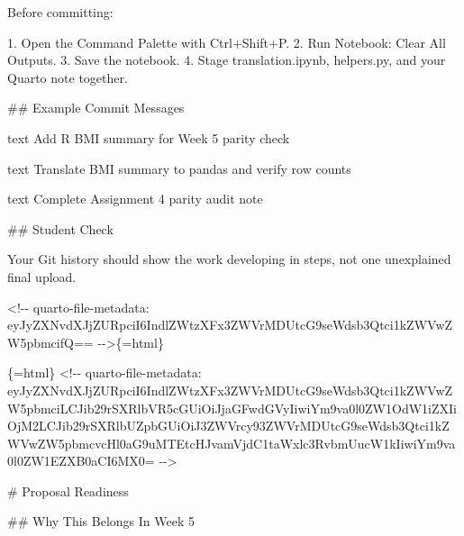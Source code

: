 \documentclass[
  letterpaper,
  DIV=11,
  numbers=noendperiod,
  oneside]{scrreprt}
\newenvironment{Shaded}{\begin{snugshade}}{\end{snugshade}}
\newcommand{\FunctionTok}[1]{\textcolor[rgb]{0.28,0.35,0.67}{#1}}
\newcommand{\InformationTok}[1]{\textcolor[rgb]{0.37,0.37,0.37}{#1}}
\newcommand{\NormalTok}[1]{\textcolor[rgb]{0.00,0.23,0.31}{#1}}
\newcommand{\SpecialStringTok}[1]{\textcolor[rgb]{0.13,0.47,0.30}{#1}}
\begin{document}
\begin{Shaded}
\begin{Highlighting}[numbers=left,,]
\NormalTok{Before committing:}

\SpecialStringTok{1. }\NormalTok{Open the Command Palette with }\InformationTok{\textasciigrave{}Ctrl+Shift+P\textasciigrave{}}\NormalTok{.}
\SpecialStringTok{2. }\NormalTok{Run }\InformationTok{\textasciigrave{}Notebook: Clear All Outputs\textasciigrave{}}\NormalTok{.}
\SpecialStringTok{3. }\NormalTok{Save the notebook.}
\SpecialStringTok{4. }\NormalTok{Stage }\InformationTok{\textasciigrave{}translation.ipynb\textasciigrave{}}\NormalTok{, }\InformationTok{\textasciigrave{}helpers.py\textasciigrave{}}\NormalTok{, and your Quarto note together.}

\FunctionTok{\#\# Example Commit Messages}

\InformationTok{\textasciigrave{}\textasciigrave{}\textasciigrave{}text}
\InformationTok{Add R BMI summary for Week 5 parity check}
\InformationTok{\textasciigrave{}\textasciigrave{}\textasciigrave{}}

\InformationTok{\textasciigrave{}\textasciigrave{}\textasciigrave{}text}
\InformationTok{Translate BMI summary to pandas and verify row counts}
\InformationTok{\textasciigrave{}\textasciigrave{}\textasciigrave{}}

\InformationTok{\textasciigrave{}\textasciigrave{}\textasciigrave{}text}
\InformationTok{Complete Assignment 4 parity audit note}
\InformationTok{\textasciigrave{}\textasciigrave{}\textasciigrave{}}

\FunctionTok{\#\# Student Check}

\NormalTok{Your Git history should show the work developing in steps, not one unexplained final upload.}


\InformationTok{\textasciigrave{}\textless{}!{-}{-} quarto{-}file{-}metadata: eyJyZXNvdXJjZURpciI6IndlZWtzXFx3ZWVrMDUtcG9seWdsb3Qtci1kZWVwZW5pbmcifQ== {-}{-}\textgreater{}\textasciigrave{}}\NormalTok{\{=html\}}

\InformationTok{\textasciigrave{}\textasciigrave{}\textasciigrave{}\{=html\}}
\InformationTok{\textless{}!{-}{-} quarto{-}file{-}metadata: eyJyZXNvdXJjZURpciI6IndlZWtzXFx3ZWVrMDUtcG9seWdsb3Qtci1kZWVwZW5pbmciLCJib29rSXRlbVR5cGUiOiJjaGFwdGVyIiwiYm9va0l0ZW1OdW1iZXIiOjM2LCJib29rSXRlbUZpbGUiOiJ3ZWVrcy93ZWVrMDUtcG9seWdsb3Qtci1kZWVwZW5pbmcvcHl0aG9uMTEtcHJvamVjdC1taWxlc3RvbmUucW1kIiwiYm9va0l0ZW1EZXB0aCI6MX0= {-}{-}\textgreater{}}
\InformationTok{\textasciigrave{}\textasciigrave{}\textasciigrave{}}

\FunctionTok{\# Proposal Readiness }


\FunctionTok{\#\# Why This Belongs In Week 5}


\end{Highlighting}
\end{Shaded}
\end{document}
